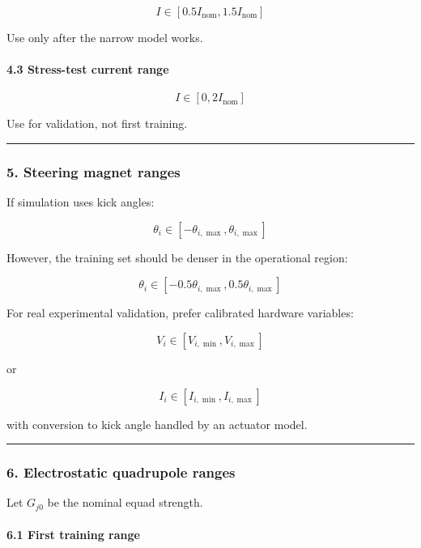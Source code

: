 \documentclass[
]{article}
\begin{document}
\[
I \in [0.5I_{\mathrm{nom}},1.5I_{\mathrm{nom}}]
\]

Use only after the narrow model works.

\hypertarget{stress-test-current-range}{%
\paragraph{4.3 Stress-test current
range}\label{stress-test-current-range}}

\[
I \in [0,2I_{\mathrm{nom}}]
\]

Use for validation, not first training.

\begin{center}\rule{0.5\linewidth}{0.5pt}\end{center}

\hypertarget{steering-magnet-ranges}{%
\subsubsection{5. Steering magnet ranges}\label{steering-magnet-ranges}}

If simulation uses kick angles:

\[
\theta_i \in [-\theta_{i,\max},\theta_{i,\max}]
\]

However, the training set should be denser in the operational region:

\[
\theta_i \in [-0.5\theta_{i,\max},0.5\theta_{i,\max}]
\]

For real experimental validation, prefer calibrated hardware variables:

\[
V_i \in [V_{i,\min},V_{i,\max}]
\]

or

\[
I_i \in [I_{i,\min},I_{i,\max}]
\]

with conversion to kick angle handled by an actuator model.

\begin{center}\rule{0.5\linewidth}{0.5pt}\end{center}

\hypertarget{electrostatic-quadrupole-ranges}{%
\subsubsection{6. Electrostatic quadrupole
ranges}\label{electrostatic-quadrupole-ranges}}

Let \(G_{j0}\) be the nominal equad strength.

\hypertarget{first-training-range}{%
\paragraph{6.1 First training range}\label{first-training-range}}
\end{document}
